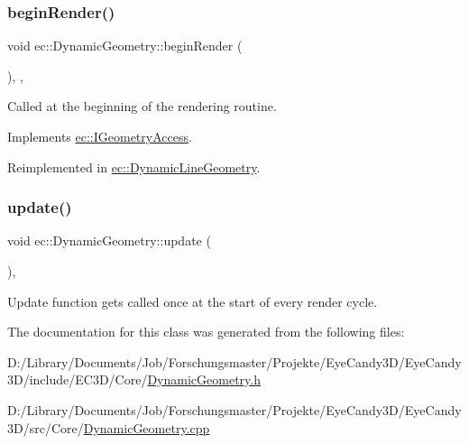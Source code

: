 \subsubsection{\texorpdfstring{begin\+Render()}{beginRender()}}
{\footnotesize\ttfamily void ec\+::\+Dynamic\+Geometry\+::begin\+Render (\begin{DoxyParamCaption}{ }\end{DoxyParamCaption})\hspace{0.3cm}{\ttfamily [override]}, {\ttfamily [protected]}, {\ttfamily [virtual]}}

Called at the beginning of the rendering routine. 

Implements \mbox{\hyperlink{classec_1_1_i_geometry_access_a17a87aca44e2a23a6185e78262e02652}{ec\+::\+I\+Geometry\+Access}}.



Reimplemented in \mbox{\hyperlink{classec_1_1_dynamic_line_geometry_ada76857787fc930fd44382e838842687}{ec\+::\+Dynamic\+Line\+Geometry}}.

\mbox{\label{classec_1_1_dynamic_geometry_a76ddfd59d22b89ada5af4fc57e118dee}} 
\subsubsection{\texorpdfstring{update()}{update()}}
{\footnotesize\ttfamily void ec\+::\+Dynamic\+Geometry\+::update (\begin{DoxyParamCaption}{ }\end{DoxyParamCaption})\hspace{0.3cm}{\ttfamily [protected]}, {\ttfamily [virtual]}}

Update function gets called once at the start of every render cycle. 

The documentation for this class was generated from the following files\+:\begin{DoxyCompactItemize}
\item 
D\+:/\+Library/\+Documents/\+Job/\+Forschungsmaster/\+Projekte/\+Eye\+Candy3\+D/\+Eye\+Candy3\+D/include/\+E\+C3\+D/\+Core/\mbox{\hyperlink{_dynamic_geometry_8h}{Dynamic\+Geometry.\+h}}\item 
D\+:/\+Library/\+Documents/\+Job/\+Forschungsmaster/\+Projekte/\+Eye\+Candy3\+D/\+Eye\+Candy3\+D/src/\+Core/\mbox{\hyperlink{_dynamic_geometry_8cpp}{Dynamic\+Geometry.\+cpp}}\end{DoxyCompactItemize}
